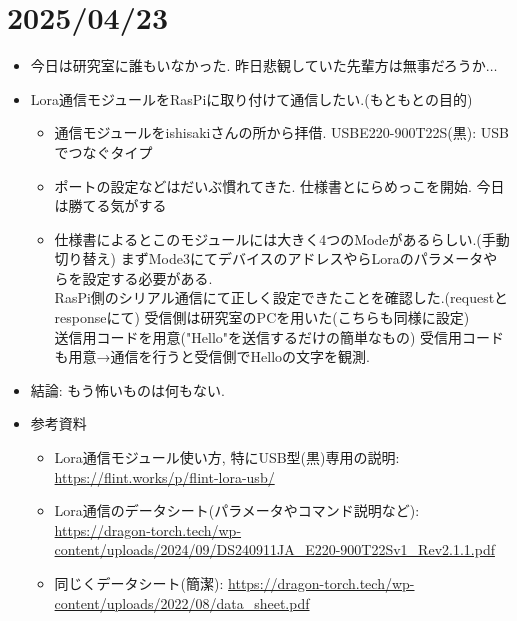 \documentclass[11pt,a4paper,uplatex]{jsarticle}
\begin{document}
\section{2025/04/23}
\begin{itemize}
    \item 今日は研究室に誰もいなかった. 昨日悲観していた先輩方は無事だろうか$\dots$
    \item Lora通信モジュールをRasPiに取り付けて通信したい.(もともとの目的)
    \begin{itemize}
        \item 通信モジュールをishisakiさんの所から拝借. USBE220-900T22S(黒): USBでつなぐタイプ
        \item ポートの設定などはだいぶ慣れてきた. 仕様書とにらめっこを開始. 今日は勝てる気がする
        \item 仕様書によるとこのモジュールには大きく4つのModeがあるらしい.(手動切り替え) まずMode3にてデバイスのアドレスやらLoraのパラメータやらを設定する必要がある. \\ 
        RasPi側のシリアル通信にて正しく設定できたことを確認した.(requestとresponseにて) 受信側は研究室のPCを用いた(こちらも同様に設定) \\
        送信用コードを用意("Hello"を送信するだけの簡単なもの) 受信用コードも用意→通信を行うと受信側でHelloの文字を観測.
    \end{itemize}
    \item 結論: もう怖いものは何もない.
    \item 参考資料
    \begin{itemize}
        \item Lora通信モジュール使い方, 特にUSB型(黒)専用の説明: \url{https://flint.works/p/flint-lora-usb/}
        \item Lora通信のデータシート(パラメータやコマンド説明など): \url{https://dragon-torch.tech/wp-content/uploads/2024/09/DS240911JA_E220-900T22Sv1_Rev2.1.1.pdf}
        \item 同じくデータシート(簡潔): \url{https://dragon-torch.tech/wp-content/uploads/2022/08/data_sheet.pdf}
    \end{itemize}
\end{itemize}
\end{document}
